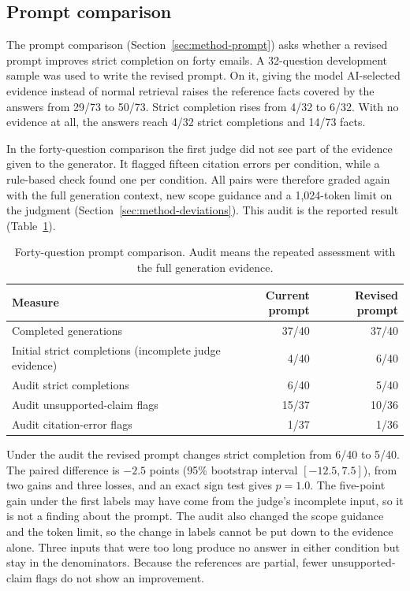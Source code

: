 \subsection{Prompt comparison}
\label{sec:results-prompt}

The prompt comparison (Section~\ref{sec:method-prompt}) asks whether a revised prompt improves strict completion on forty emails. A 32-question development sample was used to write the revised prompt. On it, giving the model AI-selected evidence instead of normal retrieval raises the reference facts covered by the answers from 29/73 to 50/73. Strict completion rises from 4/32 to 6/32. With no evidence at all, the answers reach 4/32 strict completions and 14/73 facts.

In the forty-question comparison the first judge did not see part of the evidence given to the generator. It flagged fifteen citation errors per condition, while a rule-based check found one per condition. All pairs were therefore graded again with the full generation context, new scope guidance and a 1,024-token limit on the judgment (Section~\ref{sec:method-deviations}). This audit is the reported result (Table~\ref{tab:prompt}).

\begin{table}[t]
\centering\small
\caption[Forty-question prompt comparison]{Forty-question prompt comparison. Audit means the repeated assessment with the full generation evidence.}\label{tab:prompt}
\begin{tabular}{lrr}
\toprule
Measure & Current prompt & Revised prompt\\
\midrule
Completed generations & 37/40 & 37/40\\
Initial strict completions (incomplete judge evidence) & 4/40 & 6/40\\
Audit strict completions & 6/40 & 5/40\\
Audit unsupported-claim flags & 15/37 & 10/36\\
Audit citation-error flags & 1/37 & 1/36\\
\bottomrule
\end{tabular}
\end{table}

Under the audit the revised prompt changes strict completion from 6/40 to 5/40. The paired difference is $-2.5$ points (95\% bootstrap interval $[-12.5,7.5]$), from two gains and three losses, and an exact sign test gives $p=1.0$. The five-point gain under the first labels may have come from the judge's incomplete input, so it is not a finding about the prompt. The audit also changed the scope guidance and the token limit, so the change in labels cannot be put down to the evidence alone. Three inputs that were too long produce no answer in either condition but stay in the denominators. Because the references are partial, fewer unsupported-claim flags do not show an improvement.

